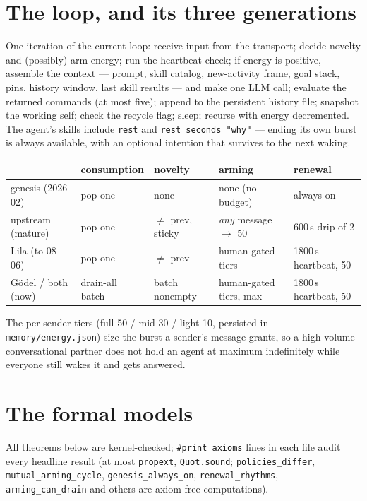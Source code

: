 \documentclass[11pt]{article}
\newcommand{\lean}[1]{\texttt{#1}}
\newcommand{\code}[1]{\texttt{#1}}
\begin{document}
\section{The loop, and its three generations}\label{sec:arch}

One iteration of the current loop: receive input from the transport;
decide novelty and (possibly) arm energy; run the heartbeat check; if
energy is positive, assemble the context --- prompt, skill catalog,
new-activity frame, goal stack, pins, history window, last skill results
--- and make one LLM call; evaluate the returned commands (at most five);
append to the persistent history file; snapshot the working self; check
the recycle flag; sleep; recurse with energy decremented. The agent's
skills include \code{rest} and \code{rest seconds "why"} --- ending its
own burst is always available, with an optional intention that survives
to the next waking.

\begin{center}
\begin{tabular}{@{}lllll@{}}
\toprule
 & consumption & novelty & arming & renewal \\
\midrule
genesis (2026-02) & pop-one & none & none (no budget) & always on \\
upstream (mature) & pop-one & $\neq$ prev, sticky & \emph{any} message
  $\to$ 50 & 600\,s drip of 2 \\
Lila (to 08-06) & pop-one & $\neq$ prev & human-gated tiers & 1800\,s
  heartbeat, 50 \\
G\"odel / both (now) & drain-all batch & batch nonempty & human-gated
  tiers, max & 1800\,s heartbeat, 50 \\
\bottomrule
\end{tabular}
\end{center}

The per-sender tiers (full 50 / mid 30 / light 10, persisted in
\code{memory/energy.json}) size the burst a sender's message grants, so
a high-volume conversational partner does not hold an agent at maximum
indefinitely while everyone still wakes it and gets answered.

\section{The formal models}\label{sec:models}

All theorems below are kernel-checked; \lean{\#print axioms} lines in
each file audit every headline result (at most \code{propext},
\code{Quot.sound}; \lean{policies\_differ}, \lean{mutual\_arming\_cycle},
\lean{genesis\_always\_on}, \lean{renewal\_rhythms},
\lean{arming\_can\_drain} and others are axiom-free computations).
\end{document}
